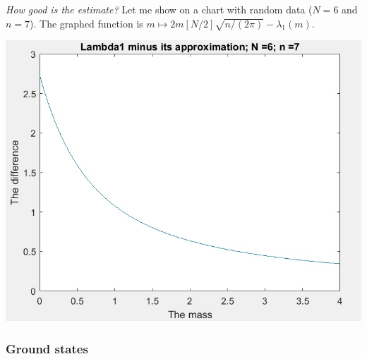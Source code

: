 \noindent\emph{How good is the estimate?} Let me show on a chart with random data ($N= 6$ and $n= 7$). The graphed function is $m \mapsto 2m[N/2]\sqrt{n/(2\pi)} - \lambda_1(m)$.
\begin{center}
\includegraphics[scale=0.8]{conv6_7.jpg}
\end{center}


\subsubsection{Ground states}

